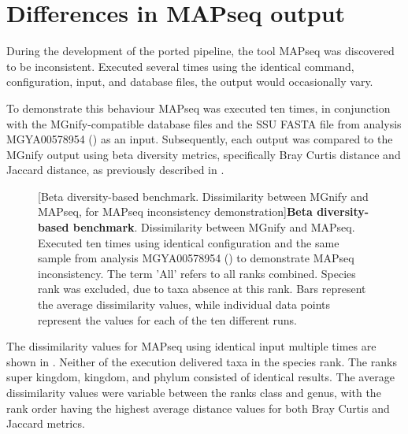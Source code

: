 \section{Differences in MAPseq output}\label{results_MAPseq_inconsistency}
During the development of the ported pipeline, the tool MAPseq was discovered to be inconsistent. Executed several times using the identical command, configuration, input, and database files, the output would occasionally vary.\par
To demonstrate this behaviour MAPseq was executed ten times, in conjunction with the MGnify-compatible database files and the SSU FASTA file from analysis MGYA00578954 () as an input. Subsequently, each output was compared to the MGnify output using beta diversity metrics, specifically Bray Curtis distance and Jaccard distance, as previously described in .

\begin{figure}[H]
  \centering
  \hfill
  [Beta diversity-based benchmark. Dissimilarity between MGnify and MAPseq, for MAPseq inconsistency demonstration]{\textbf{Beta diversity-based benchmark}. Dissimilarity between MGnify and MAPseq. Executed ten times using identical configuration and the same sample from analysis MGYA00578954 () to demonstrate MAPseq inconsistency. The term 'All' refers to all ranks combined. Species rank was excluded, due to taxa absence at this rank. Bars represent the average dissimilarity values, while individual data points represent the values for each of the ten different runs.} \label{fig:mapseq_test_beta_div_plot.png}%
\end{figure}

The dissimilarity values for MAPseq using identical input multiple times are shown in . Neither of the execution delivered taxa in the species rank. The ranks super kingdom, kingdom, and phylum consisted of identical results. The average dissimilarity values were variable between the ranks class and genus, with the rank order having the highest average distance values for both Bray Curtis and Jaccard metrics.